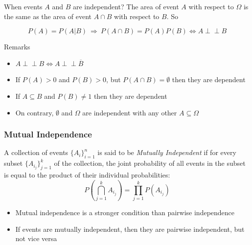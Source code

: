 \documentclass[fullscreen=true, bookmarks=true, hyperref={pdfencoding=unicode}]{beamer}
\newcommand{\indep}{\perp \!\!\! \perp}
\begin{document}
\begin{frame}{When events $A$ and $B$ are independent?}
  The area of event $A$ with respect to $\Omega$ is the same as the 
  area of event $A\cap B$ with respect to $B$. So

  $$P(A) =  P(A|B)\ \Rightarrow\ P(A \cap B) = P(A)P(B) \Leftrightarrow A \indep B$$

  \begin{block}{Remarks}
    \begin{itemize}
      \pause\item $A \indep B \Leftrightarrow A \indep \overline{B}$
      \pause\item If $P(A) > 0$ and $P(B) > 0$, but $P(A \cap B) = \emptyset$ 
      then they are dependent
      \pause\item If $A \subseteq B$ and $P(B) \neq 1$ then they are dependent
      \pause\item On contrary, $\emptyset$ and $\Omega$ are independent with any other $A \subseteq \Omega$
    \end{itemize}  
  \end{block}

\end{frame}


\begin{frame}
  \frametitle{Mutual Independence}

  \begin{definition}
    A collection of events $\{A_i\}_{i=1}^{n}$ is said to be 
    \textit{Mutually Independent} if for every subset 
    $\{A_{i_j}\}_{j=1}^{k}$ of the collection, 
    the joint probability of all events in the subset is equal 
    to the product of their individual probabilities:
    \[
    P\left(\bigcap_{j=1}^{k} A_{i_j}\right) = \prod_{j=1}^{k} P(A_{i_j})
    \]
  \end{definition}
  
  \begin{itemize}
    \pause\item Mutual independence is a stronger condition than pairwise independence
    \pause\item If events are mutually independent, then they are pairwise independent, but not vice versa
  \end{itemize}
\end{frame}
\end{document}
